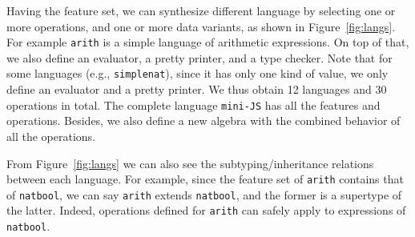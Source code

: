 Having the feature set, we can synthesize different language by selecting one or
more operations, and one or more data variants, as shown in
Figure~\ref{fig:langs}. For example \lstinline{arith} is a simple language of
arithmetic expressions. On top of that, we also define an evaluator, a pretty
printer, and a type checker. Note that for some languages (e.g.,
\lstinline{simplenat}), since it has only one kind of value, we only define an
evaluator and a pretty printer. We thus obtain 12 languages and 30 operations in
total. The complete language \lstinline{mini-JS} has all the features and
operations. Besides, we also define a new algebra with the combined behavior of
all the operations.


From Figure~\ref{fig:langs} we can also see the subtyping/inheritance relations
between each language. For example, since the feature set of \lstinline{arith}
contains that of \lstinline{natbool}, we can say \lstinline{arith} extends
\lstinline{natbool}, and the former is a supertype of the latter. Indeed,
operations defined for \lstinline{arith} can safely apply to expressions of \lstinline{natbool}.



